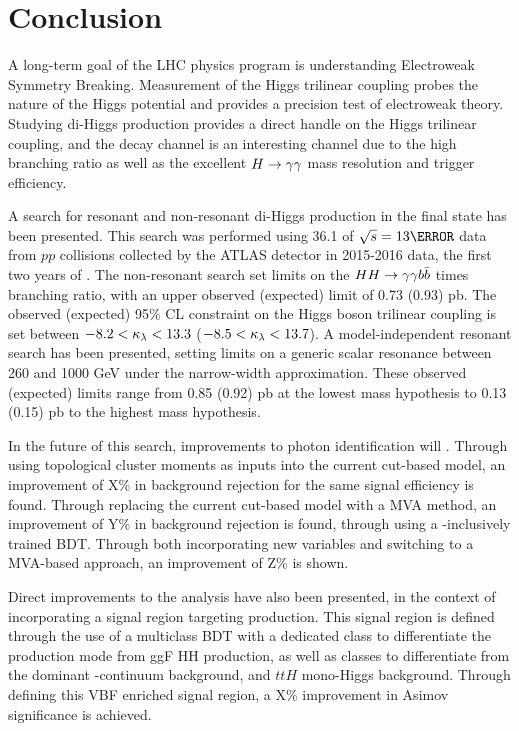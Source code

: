 \chapter{Conclusion}

A long-term goal of the \gls{LHC} physics program is understanding Electroweak Symmetry Breaking. Measurement of the Higgs trilinear coupling probes the nature of the Higgs potential and provides a precision test of electroweak theory. Studying di-Higgs production provides a direct handle on the Higgs trilinear coupling, and the \yybb decay channel is an interesting channel due to the high \Hbb branching ratio as well as the excellent $H\rightarrow \gamma\gamma$ mass resolution and trigger efficiency.

A search for resonant and non-resonant di-Higgs production in the \yybb final state has been presented. This search was performed using 36.1 \ifb of $\sqs = \unit{13}{\TeV}$ data from $pp$ collisions collected by the ATLAS detector in 2015-2016 data, the first two years of \RunTwo. The non-resonant search set limits on the $HH\rightarrow\gamma\gamma b\bar{b}$ \xsec times branching ratio, with an upper observed (expected) limit of 0.73 (0.93) pb. The observed (expected) 95\% \gls{CL} constraint on the Higgs boson trilinear coupling is set between $-8.2 < \kappa_{\lambda} < 13.3$ ($-8.5 < \kappa_{\lambda} < 13.7$). A model-independent resonant search has been presented, setting limits on a generic scalar resonance between 260 and 1000 GeV under the narrow-width approximation. These observed (expected) limits range from 0.85 (0.92) pb at the lowest mass hypothesis to 0.13 (0.15) pb to the highest mass hypothesis.

In the future of this search, improvements to photon identification will . Through using topological cluster moments as inputs into the current cut-based model, an improvement of X\% in background rejection for the same signal efficiency is found. Through replacing the current cut-based model with a \gls{MVA} method, an improvement of Y\% in background rejection is found, through using a \pt-inclusively trained \gls{BDT}. Through both incorporating new variables and switching to a \gls{MVA}-based approach, an improvement of Z\% is shown.

Direct improvements to the analysis have also been presented, in the context of incorporating a signal region targeting  production. This signal region is defined through the use of a multiclass \gls{BDT} with a dedicated class to differentiate the production mode from ggF HH production, as well as classes to differentiate from the dominant \yy-continuum background, and $ttH$ mono-Higgs background. Through defining this \gls{VBF} enriched signal region, a X\% improvement in Asimov significance is achieved. 